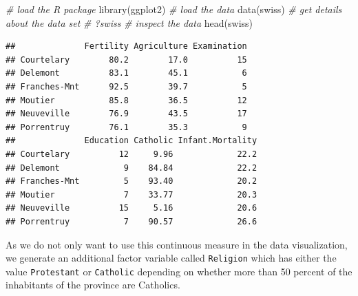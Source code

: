 \documentclass[
  12pt,
]{style/krantz}
\newenvironment{Shaded}{\begin{snugshade}}{\end{snugshade}}
\newcommand{\CommentTok}[1]{\textcolor[rgb]{0.56,0.35,0.01}{\textit{#1}}}
\newcommand{\DecValTok}[1]{\textcolor[rgb]{0.00,0.00,0.81}{#1}}
\newcommand{\FunctionTok}[1]{\textcolor[rgb]{0.00,0.00,0.00}{#1}}
\newcommand{\NormalTok}[1]{#1}
\newcommand{\OtherTok}[1]{\textcolor[rgb]{0.56,0.35,0.01}{#1}}
\newcommand{\SpecialCharTok}[1]{\textcolor[rgb]{0.00,0.00,0.00}{#1}}
\newcommand{\StringTok}[1]{\textcolor[rgb]{0.31,0.60,0.02}{#1}}
\begin{document}
\begin{Shaded}
\begin{Highlighting}[]
\CommentTok{\# load the R package}
\FunctionTok{library}\NormalTok{(ggplot2)}
\CommentTok{\# load the data}
\FunctionTok{data}\NormalTok{(swiss)}
\CommentTok{\# get details about the data set}
\CommentTok{\# ?swiss}
\CommentTok{\# inspect the data}
\FunctionTok{head}\NormalTok{(swiss)}
\end{Highlighting}
\end{Shaded}

\begin{verbatim}
##              Fertility Agriculture Examination
## Courtelary        80.2        17.0          15
## Delemont          83.1        45.1           6
## Franches-Mnt      92.5        39.7           5
## Moutier           85.8        36.5          12
## Neuveville        76.9        43.5          17
## Porrentruy        76.1        35.3           9
##              Education Catholic Infant.Mortality
## Courtelary          12     9.96             22.2
## Delemont             9    84.84             22.2
## Franches-Mnt         5    93.40             20.2
## Moutier              7    33.77             20.3
## Neuveville          15     5.16             20.6
## Porrentruy           7    90.57             26.6
\end{verbatim}

As we do not only want to use this continuous measure in the data visualization, we generate an additional factor variable called \texttt{Religion} which has either the value \texttt{\textquotesingle{}Protestant\textquotesingle{}} or \texttt{\textquotesingle{}Catholic\textquotesingle{}} depending on whether more than 50 percent of the inhabitants of the province are Catholics.

\begin{Shaded}
\end{Shaded}
\end{document}
